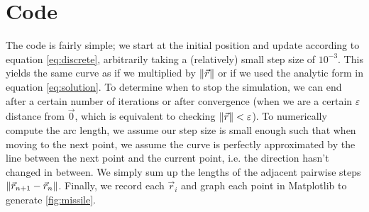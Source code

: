 \documentclass[11pt, oneside]{article}
\begin{document}
\newpage

\section{Code}

The code is fairly simple; we start at the initial position and update
according to equation \eqref{eq:discrete}, arbitrarily taking a (relatively)
small step size of \( 10^{-3} \). This yields the same curve as if we
multiplied by \( \norm{\vec{r}} \) or if we used the analytic form in equation
\eqref{eq:solution}. To determine when to stop the simulation, we can end
after a certain number of iterations or after convergence (when we are a
certain \( \varepsilon \) distance from \( \vec{0} \), which is equivalent
to checking \( \norm{\vec{r}} < \varepsilon \)). To numerically compute the
arc length, we assume our step size is small enough such that when moving to
the next point, we assume the curve is perfectly approximated by the line
between the next point and the current point, i.e. the direction hasn't changed
in between. We simply sum up the lengths of the adjacent pairwise steps \(
\norm{\vec{r}_{n + 1} - \vec{r}_n} \). Finally, we record each \( \vec{r}_i
\) and graph each point in Matplotlib to generate \autoref{fig:missile}.

\newpage
\end{document}
